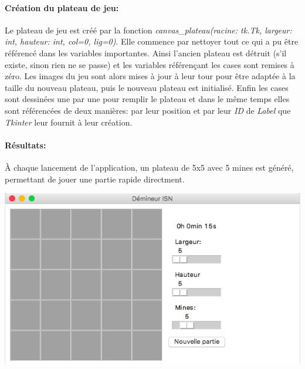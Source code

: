 \documentclass[12pt, a4paper]{article}
\begin{document}
\paragraph{Création du plateau de jeu:}
Le plateau de jeu est créé par la fonction \emph{canvas\_plateau(racine: tk.Tk,
largeur: int, hauteur: int, col=0, lig=0)}. Elle commence par nettoyer tout
ce qui a pu être référencé dans les variables importantes. Ainsi l'ancien
plateau est détruit (s'il existe, sinon rien ne se passe) et les variables
référençant les cases sont remises à zéro. Les images du jeu sont alors mises
à jour à leur tour pour être adaptée à la taille du nouveau plateau, puis le
nouveau plateau est initialisé. Enfin les cases sont dessinées une par une
pour remplir le plateau et dans le même temps elles sont référencées de deux
manières: par leur position et par leur \emph{ID} de \emph{Label} que
\emph{Tkinter} leur fournit à leur création.

\paragraph{Résultats:}
À chaque lancement de l'application, un plateau de 5x5 avec 5 mines est généré,
permettant de jouer une partie rapide directment. \\

\centerline{\includegraphics[scale=0.5]{interface_exemple.png}}
\end{document}
